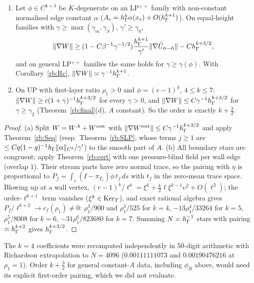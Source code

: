 \begin{theorem}\label{rb:sharp}
\begin{enumerate}[label=(\alph*)]
\item Let $\phi\in C^{k+3}$ be $K$-degenerate on an LP$^{++}$ family with non-constant normalised edge constant $\alpha$ ($A_e=h_\Gamma^k\alpha(x_e)+O(h_\Gamma^{k+1})$). On equal-height families with $\gamma\ge\max(\gamma_m,\gamma_S)$, $\gamma'\ge\gamma_0$,
\[
\lVert \nabla W\rVert\ge(1-C\beta^{-1}\gamma^{-1/2})\frac{h_\Gamma^{k+1}}{\gamma'}\lVert \nabla\tilde U_{\alpha-\bar\alpha}\rVert-Ch_\Gamma^{k+3/2},
\]
and on general LP$^{++}$ families the same holds for $\gamma\ge\gamma(\phi)$. With Corollary~\ref{rb:Rc}, $\lVert \nabla W\rVert\asymp\gamma^{-1}h_\Gamma^{k+1}$.
\item On \textsf{UP} with first-layer ratio $\rho_1>0$ and $\phi=(r-1)^k$, $4\le k\le7$: $\lVert \nabla W\rVert\ge c(1+\gamma)^{-1}h_\Gamma^{k+3/2}$ for every $\gamma>0$, and $\lVert \nabla W\rVert\le C\gamma^{-1}h_\Gamma^{k+3/2}$ for $\gamma\ge\gamma_2$ (Theorem~\ref{rb:final}(d), $A$ constant). So the order is exactly $k+\frac32$.
\end{enumerate}
\end{theorem}

\begin{proof}
(a) Split $W=W^A+W^{\rm rest}$ with $\lVert \nabla W^{\rm rest}\rVert\le C\gamma^{-1}h_\Gamma^{k+3/2}$ and apply Theorem~\ref{rb:Seq} (resp.\ Theorem~\ref{rb:SLP}, whose terms $j\ge1$ are $\le Cq(1-q)^{-1}h_\Gamma\lVert \alpha\rVert_{C^3}/\gamma'$) to the smooth part of $A$. (b) All boundary stars are congruent; apply Theorem~\ref{rb:cert} with one pressure-blind field per wall edge (overlap $1$). Their stream parts have zero normal trace, so the pairing with $\eta$ is proportional to $P_f=\int_e(I-\pi_{T_e})\phi\,t_f\,ds$ with $t_f$ in the zero-mean trace space. Blowing up at a wall vertex, $(r-1)^k/\ell^k=\xi^k+\frac k2\ell\xi^{k-1}\upsilon^2+O(\ell^2)$; the order-$\ell^{k+1}$ term vanishes ($\xi^k\in\operatorname{Ker}_T$), and exact rational algebra gives $P_f/\ell^{k+2}\to c_f(\rho_1)\ne0$: $\rho_1^3/900$ and $\rho_1^3/525$ for $k=4$, $-13\rho_1^4/33264$ for $k=5$, $\rho_1^5/8008$ for $k=6$, $-31\rho_1^6/823680$ for $k=7$. Summing $N\asymp h_\Gamma^{-1}$ stars with pairing $\asymp h_\Gamma^{k+2}$ gives $h_\Gamma^{k+3/2}$.
\end{proof}

The $k=4$ coefficients were recomputed independently in 50-digit arithmetic with Richardson extrapolation to $N=4096$ ($0.00111111073$ and $0.00190476216$ at $\rho_1=1$). Order $k+\frac32$ for general constant-$A$ data, including $\phi_B$ above, would need its explicit first-order pairing, which we did not evaluate.

